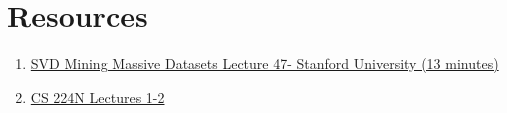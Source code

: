 \documentclass[12pt]{article}
\begin{document}
\section{Resources}
\begin{enumerate}
    \item \href{https://www.youtube.com/watch?v=P5mlg91as1c}{SVD Mining Massive Datasets Lecture 47- Stanford University (13 minutes)}
    \item \href{https://web.stanford.edu/class/cs224n/}{CS 224N Lectures 1-2}
\end{enumerate}
\end{document}
